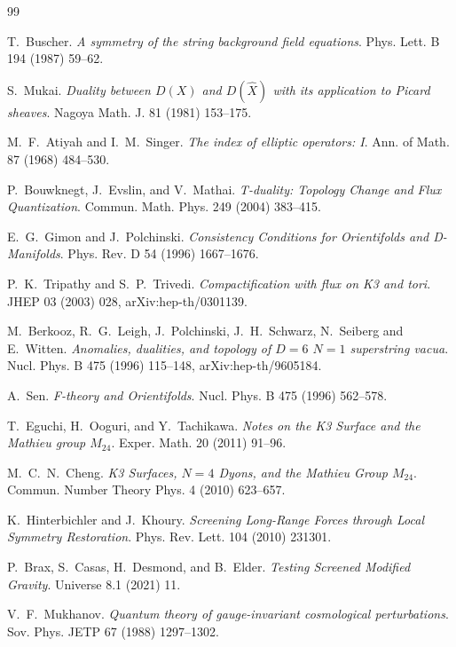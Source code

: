 \documentclass[11pt,a4paper]{article}
\begin{document}

\begin{thebibliography}{99}

T.~Buscher.
\textit{A symmetry of the string background field equations}.
Phys. Lett. B 194 (1987) 59--62.

S.~Mukai.
\textit{Duality between $D(X)$ and $D(\widehat{X})$ with its application to Picard sheaves}.
Nagoya Math. J. 81 (1981) 153--175.

M.~F.~Atiyah and I.~M.~Singer.
\textit{The index of elliptic operators: I}.
Ann. of Math. 87 (1968) 484--530.

P.~Bouwknegt, J.~Evslin, and V.~Mathai.
\textit{T-duality: Topology Change and Flux Quantization}.
Commun. Math. Phys. 249 (2004) 383--415.

E.~G.~Gimon and J.~Polchinski.
\textit{Consistency Conditions for Orientifolds and D-Manifolds}.
Phys. Rev. D 54 (1996) 1667--1676.

P.~K.~Tripathy and S.~P.~Trivedi.
\textit{Compactification with flux on K3 and tori}.
JHEP 03 (2003) 028, arXiv:hep-th/0301139.

M.~Berkooz, R.~G.~Leigh, J.~Polchinski, J.~H.~Schwarz, N.~Seiberg and E.~Witten.
\textit{Anomalies, dualities, and topology of $D=6$ $N=1$ superstring vacua}.
Nucl. Phys. B 475 (1996) 115--148, arXiv:hep-th/9605184.

A.~Sen.
\textit{F-theory and Orientifolds}.
Nucl. Phys. B 475 (1996) 562--578.

T.~Eguchi, H.~Ooguri, and Y.~Tachikawa.
\textit{Notes on the K3 Surface and the Mathieu group $M_{24}$}.
Exper. Math. 20 (2011) 91--96.

M.~C.~N.~Cheng.
\textit{K3 Surfaces, $N=4$ Dyons, and the Mathieu Group $M_{24}$}.
Commun. Number Theory Phys. 4 (2010) 623--657.

K.~Hinterbichler and J.~Khoury.
\textit{Screening Long-Range Forces through Local Symmetry Restoration}.
Phys. Rev. Lett. 104 (2010) 231301.

P.~Brax, S.~Casas, H.~Desmond, and B.~Elder.
\textit{Testing Screened Modified Gravity}.
Universe 8.1 (2021) 11.

V.~F.~Mukhanov.
\textit{Quantum theory of gauge-invariant cosmological perturbations}.
Sov. Phys. JETP 67 (1988) 1297--1302.


\end{thebibliography}
\end{document}
